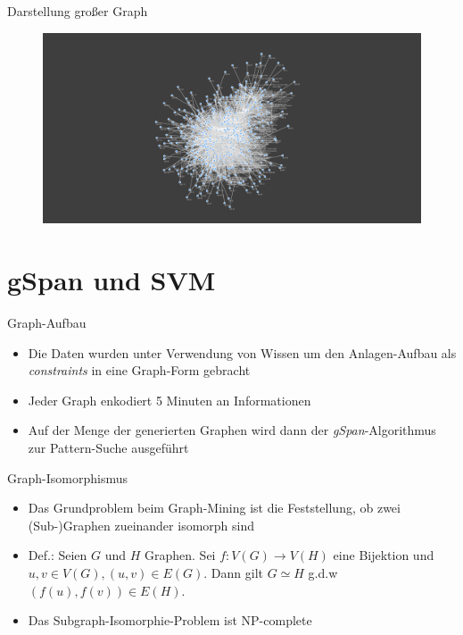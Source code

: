 \documentclass{beamer}
\begin{document}
  \begin{frame}{Darstellung großer Graph}
\begin{figure}
    \centering
    \noindent\includegraphics[width=\linewidth]{images/fullgraph}
    \label{fig:fullgraph}
\end{figure}
\end{frame}

\section{gSpan und SVM}
\begin{frame}{Graph-Aufbau}
\begin{itemize}
    \item Die Daten wurden unter Verwendung von Wissen um den Anlagen-Aufbau als \textit{constraints} in eine Graph-Form gebracht
    \item Jeder Graph enkodiert 5 Minuten an Informationen
    \item Auf der Menge der generierten Graphen wird dann der \textit{gSpan}-Algorithmus zur Pattern-Suche ausgeführt
\end{itemize}
\end{frame}

\begin{frame}{Graph-Isomorphismus}
\begin{itemize}
    \item Das Grundproblem beim Graph-Mining ist die Feststellung, ob zwei (Sub-)Graphen zueinander isomorph sind
    \item Def.: Seien $G$ und $H$ Graphen. Sei $f: V(G) \rightarrow V(H)$ eine Bijektion und $u, v \in V(G), (u,v) \in E(G)$. Dann gilt $G \simeq H$ g.d.w $(f(u), f(v)) \in E(H)$.
    \item Das Subgraph-Isomorphie-Problem ist NP-complete
\end{itemize}
\end{frame}
\end{document}
